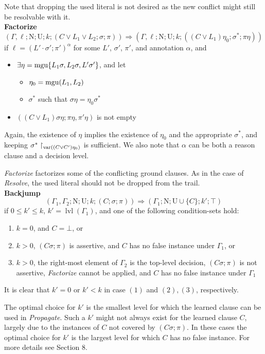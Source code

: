 \documentclass[a4paper]{article}
\newcommand{\leaveabit}{\\[6 pt]}
\begin{document}
Note that dropping the used literal is not desired as the new conflict might still be resolvable with it.\leaveabit
\textbf{Factorize}
\[(\Gamma, \ell; \text{N}; \text{U}; k; (C \lor L_1 \lor L_2; \sigma; \pi)) \Rightarrow
    (\Gamma, \ell; \text{N}; \text{U}; k; ((C \lor L_1)\eta_0; \sigma^*; \pi\eta))\]
if $\ell = (L'\cdot\sigma'; \pi')^{\alpha}$ for some $L'$, $\sigma'$, $\pi'$, and annotation $\alpha$, and
\begin{itemize}
	\item $\exists \eta = \operatorname{mgu}\{L_1\sigma, L_2\sigma, L'\sigma'\}$, and let
		\begin{itemize}
			\item $\eta_0 = \operatorname{mgu}(L_1, L_2)$
			\item $\sigma^*$ such that $\sigma\eta = \eta_0\sigma^*$
		\end{itemize}
	\item $((C\lor L_1)\sigma\eta; \pi\eta, \pi'\eta)$ is not empty
\end{itemize}
Again, the existence of $\eta$ implies the existence of $\eta_0$ and the appropriate $\sigma^*$, and 
keeping $\sigma^*\restriction_{\operatorname{var}((C \lor C')\eta_0)}$ is sufficient.
We also note that $\alpha$ can be both a reason clause and a decision level.

\emph{Factorize} factorizes some of the conflicting ground clauses. 
As in the case of \emph{Resolve}, the used literal should not be dropped from the trail.\leaveabit
\textbf{Backjump}
\[(\Gamma_1, \Gamma_2; \text{N}; \text{U}; k; (C; \sigma; \pi)) \Rightarrow
    (\Gamma_1; \text{N}; \text{U} \cup \{C\}; k'; \top)\]
if $0 \leq k' \leq k$, $k' = \operatorname{lvl}(\Gamma_1)$, and one of the following condition-sets hold:
\begin{enumerate}[(1)]
	\item $k = 0$, and $C = \bot$, or
	\item $k > 0$, $(C\sigma; \pi)$ is assertive, and $C$ has no false instance under $\Gamma_1$, or
	\item $k > 0$, the right-most element of $\Gamma_2$ is the top-level decision, 
					$(C\sigma; \pi)$ is not assertive, \emph{Factorize} cannot be applied, and $C$ has no false instance under $\Gamma_1$
\end{enumerate}
It is clear that $k' = 0$ or $k' < k$ in case $(1)$ and $(2), (3)$, respectively. 

The optimal choice for $k'$ is the smallest level for which the learned clause can be used in \emph{Propagate}.
Such a $k'$ might not always exist for the learned clause $C$, largely due to the instances of $C$ not covered 
by $(C\sigma; \pi)$. In these cases the optimal choice for $k'$ is the largest level for which $C$ has no false instance.
For more details see Section 8.
\end{document}
